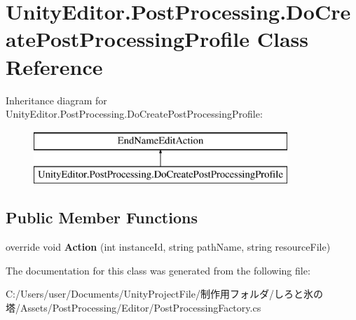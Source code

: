 \hypertarget{class_unity_editor_1_1_post_processing_1_1_do_create_post_processing_profile}{}\section{Unity\+Editor.\+Post\+Processing.\+Do\+Create\+Post\+Processing\+Profile Class Reference}
\label{class_unity_editor_1_1_post_processing_1_1_do_create_post_processing_profile}
Inheritance diagram for Unity\+Editor.\+Post\+Processing.\+Do\+Create\+Post\+Processing\+Profile\+:\begin{figure}[H]
\begin{center}
\leavevmode
\includegraphics[height=2.000000cm]{class_unity_editor_1_1_post_processing_1_1_do_create_post_processing_profile}
\end{center}
\end{figure}
\subsection*{Public Member Functions}
\begin{DoxyCompactItemize}
\item 
\mbox{\label{class_unity_editor_1_1_post_processing_1_1_do_create_post_processing_profile_ab5f81f0dce2a8bf886642315e22efd83}} 
override void {\bfseries Action} (int instance\+Id, string path\+Name, string resource\+File)
\end{DoxyCompactItemize}


The documentation for this class was generated from the following file\+:\begin{DoxyCompactItemize}
\item 
C\+:/\+Users/user/\+Documents/\+Unity\+Project\+File/制作用フォルダ/しろと氷の塔/\+Assets/\+Post\+Processing/\+Editor/Post\+Processing\+Factory.\+cs\end{DoxyCompactItemize}
